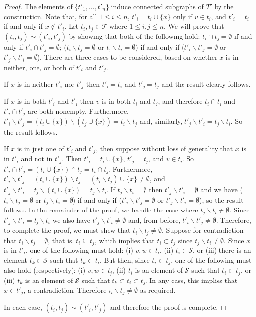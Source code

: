 \documentclass[
final
]{dmtcs-episciences}        \usepackage{graphics, amsthm, amsmath, amssymb, algorithm, algorithmic}
\begin{document}
\begin{proof}
The elements of $\{ t'_1, \ldots, t'_n \}$ induce connected subgraphs of $T'$ by the construction.
Note that, for all $1 \le i \le n$, 
$t'_i = t_i \cup \{x\}$ only if $v \in t_i$, and
$t'_i = t_i$ if and only if $x \notin t'_i$.
Let $t_i, t_j \in \mathcal T$ where $1 \le i,j \le n$.
We will prove that $(t_i, t_j) \sim (t'_i, t'_j)$ by showing that
both of the following hold:
$t_i \cap t_j = \emptyset$ if and only if $t'_i \cap t'_j = \emptyset$;  ($t_i \backslash t_j = \emptyset$ or $t_j \backslash t_i = \emptyset$) if and only if ($t'_i \backslash t'_j = \emptyset$ or $t'_j \backslash t'_i = \emptyset$). There are three cases to be considered, based on whether $x$ is in neither, one, or both of $t'_i$ and $t'_j$.

If $x$ is in neither $t'_i$ nor $t'_j$ then $t'_i = t_i$ and $t'_j = t_j$ and the result clearly follows.

If $x$ is in both $t'_i$ and $t'_j$ then $v$ is in both $t_i$ and $ t_j$, and therefore $t_i \cap t_j$ and $t'_i \cap t'_j$ are both nonempty.
Furthermore, $t'_i \backslash t'_j = (t_i \cup \{x\}) \backslash (t_j \cup \{x\}) = t_i \backslash t_j$ and, similarly, $t'_j \backslash t'_i = t_j \backslash t_i$. So the result follows.

If $x$ is in just one of $t'_i$ and $t'_j$, 
then suppose without loss of generality that $x$ is in $t'_i$ and not in $t'_j$. 
Then $t'_i = t_i \cup \{x\}$, $t'_j = t_j$, and $v \in t_i$. 
So 
$t'_i \cap t'_j = (t_i \cup \{x\}) \cap t_j = t_i \cap t_j$.
Furthermore,
$t'_i \backslash t'_j = (t_i \cup \{x\}) \backslash t_j = (t_i \backslash t_j) \cup \{x\} \ne \emptyset$,
and $t'_j \backslash t'_i = t_j \backslash (t_i \cup \{x\}) = t_j \backslash t_i$.
If $t_j \backslash t_i = \emptyset$ then $t'_j \backslash t'_i = \emptyset$ and we have 
($t_i \backslash t_j = \emptyset$ or $t_j \backslash t_i = \emptyset$) if and only if ($t'_i \backslash t'_j = \emptyset$ or $t'_j \backslash t'_i = \emptyset$),
so the result follows.
In the remainder of the proof, we handle the case where $t_j \backslash t_i \ne \emptyset$.
Since $t'_j \backslash t'_i = t_j \backslash t_i$ we also have $t'_j \backslash t'_i \ne \emptyset$ and, from before, $t'_i \backslash t'_j \ne \emptyset$.
Therefore, to complete the proof, we must show that $t_i \backslash t_j \ne \emptyset$.
Suppose for contradiction that $t_i \backslash t_j = \emptyset$, that is, $t_i \subseteq t_j$, which implies that $t_i \subset t_j$ since $t_j \backslash t_i \ne \emptyset$.
Since $x$ is in $t'_i$, one of the following must hold: 
(i) $v,w \in t_i$,
(ii) $t_i \in \mathcal S$, 
or 
(iii) there is an element $t_k \in \mathcal S$ such that $t_k \subset t_i$.
But then, since $t_i \subset t_j$, one of the following must also hold (respectively):
(i) $v, w \in t_j$, 
(ii) $t_i$ is an element of $\mathcal S$ such that $t_i \subset t_j$, 
or
(iii) $t_k$ is an element of $\mathcal S$ such that $t_k \subset t_i \subset t_j$.
In any case, this implies that $x \in t'_j$, a contradiction.
Therefore $t_i \backslash t_j \ne \emptyset$ as required.

In each case, $(t_i , t_j) \sim (t'_i , t'_j)$ and therefore the proof is complete.
\end{proof}
\end{document}
